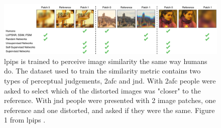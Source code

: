 \begin{figure}[ht]
    \centering
    \includegraphics[width=1.0\textwidth]{figures/lpips.png}
    \caption[LPIPS - Learned Perceptual Image Patch Similarity]{\acrshort{lpips} is trained to perceive image similarity the same way humans do. The dataset used to train the similarity metric contains two types of perceptual judgements, \acrshort{2afc} and \acrshort{jnd}. With \acrshort{2afc} people were asked to select which of the distorted images was "closer" to the reference. With \acrshort{jnd} people were presented with 2 image patches, one reference and one distorted, and asked if they were the same. Figure 1 from \acrshort{lpips} \cite{zhang_unreasonable_2018}.}
    \label{fig:lpips}
\end{figure}


